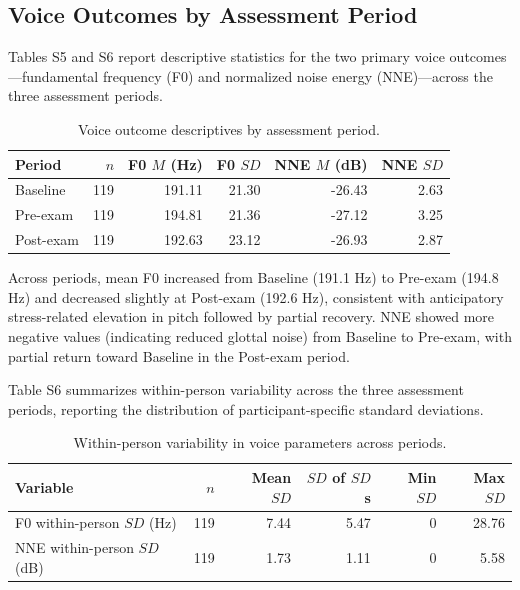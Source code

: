 \documentclass[
  english,
  man,floatsintext]{apa6}
\begin{document}
\subsection{Voice Outcomes by Assessment Period}\label{voice-outcomes-by-assessment-period}

Tables S5 and S6 report descriptive statistics for the two primary voice outcomes---fundamental frequency (F0) and normalized noise energy (NNE)---across the three assessment periods.

\begin{table}

\caption{\label{tab:table-s4-voice}Voice outcome descriptives by assessment period.}
\centering
\begin{tabular}[t]{lrrrrr}
\toprule
Period & $n$ & F0 $M$ (Hz) & F0 $SD$ & NNE $M$ (dB) & NNE $SD$\\
\midrule
Baseline & 119 & 191.11 & 21.30 & -26.43 & 2.63\\
Pre-exam & 119 & 194.81 & 21.36 & -27.12 & 3.25\\
Post-exam & 119 & 192.63 & 23.12 & -26.93 & 2.87\\
\bottomrule
\end{tabular}
\end{table}

Across periods, mean F0 increased from Baseline (191.1 Hz) to Pre-exam (194.8 Hz) and decreased slightly at Post-exam (192.6 Hz), consistent with anticipatory stress-related elevation in pitch followed by partial recovery. NNE showed more negative values (indicating reduced glottal noise) from Baseline to Pre-exam, with partial return toward Baseline in the Post-exam period.

Table S6 summarizes within-person variability across the three assessment periods, reporting the distribution of participant-specific standard deviations.

\begin{table}

\caption{\label{tab:table-s5-voice-variability}Within-person variability in voice parameters across periods.}
\centering
\begin{tabular}[t]{lrrrrr}
\toprule
Variable & $n$ & Mean $SD$ & $SD$ of $SD$s & Min $SD$ & Max $SD$\\
\midrule
F0 within-person $SD$ (Hz) & 119 & 7.44 & 5.47 & 0 & 28.76\\
NNE within-person $SD$ (dB) & 119 & 1.73 & 1.11 & 0 & 5.58\\
\bottomrule
\end{tabular}
\end{table}
\end{document}
